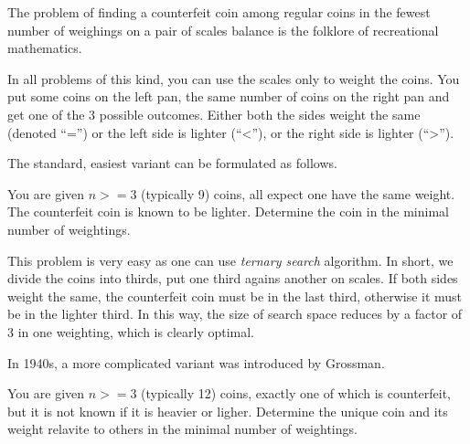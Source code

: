 The problem of finding a counterfeit coin among regular coins in the fewest
  number of weighings on a pair of scales balance is the folklore of
  recreational mathematics.

In all problems of this kind, you can use the scales only to weight the coins.
You put some coins on the left pan, the same number of coins on the right pan
  and get one of the 3 possible outcomes.
Either both the sides weight the same (denoted ``='')
  or the left side is lighter (``<''),
  or the right side is lighter (``>'').

The standard, easiest variant can be formulated as follows.

\begin{problem} \label{pr:coins9}
You are given $n >= 3$ (typically 9) coins, all expect one have the same weight.
The counterfeit coin is known to be lighter.
Determine the coin in the minimal number of weightings.
\end{problem}

This problem is very easy as one can use \emph{ternary search} algorithm.
In short, we divide the coins into thirds, put one third agains another
  on scales.
If both sides weight the same, the counterfeit coin must be in the last third,
  otherwise it must be in the lighter third.
In this way, the size of search space reduces by a factor of 3 in one weighting,
  which is clearly optimal.

In 1940s, a more complicated variant was introduced by Grossman\cite{coins-grossman1945}.

\begin{problem} \label{pr:coins12}
You are given $n >= 3$ (typically 12) coins, exactly one of which is counterfeit,
  but it is not known if it is heavier or ligher.
Determine the unique coin and its weight relavite to others
  in the minimal number of weightings.
\end{problem}

